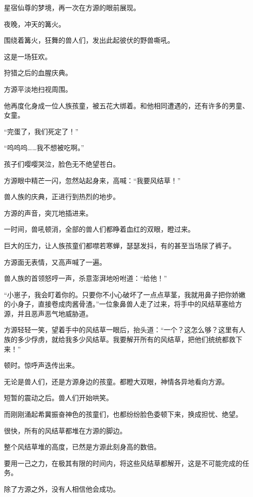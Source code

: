 
\begin{this_body}

星宿仙尊的梦境，再一次在方源的眼前展现。

夜晚，冲天的篝火。

围绕着篝火，狂舞的兽人们，发出此起彼伏的野兽嘶吼。

这是一场狂欢。

狩猎之后的血腥庆典。

方源平淡地扫视周围。

他再度化身成一位人族孩童，被五花大绑着。和他相同遭遇的，还有许多的男童、女童。

“完蛋了，我们死定了！”

“呜呜呜……我不想被吃啊。”

孩子们嘤嘤哭泣，脸色无不绝望苍白。

方源眼中精芒一闪，忽然站起身来，高喊：“我要风结草！”

兽人族的庆典，正进行到热烈的地步。

方源的声音，突兀地插进来。

一时间，兽吼顿消，全部的兽人们都睁着血红的双眼，瞪过来。

巨大的压力，让人族孩童们都噤若寒蝉，瑟瑟发抖，有的甚至当场尿了裤子。

方源面无表情，又高声喊了一遍。

兽人族的首领怒哼一声，杀意澎湃地吩咐道：“给他！”

“小崽子，我会盯着你的。只要你不小心破坏了一点点草茎，我就用鼻子把你娇嫩的小身子，直接卷成肉酱骨渣。”一位象鼻兽人走了过来，将手中的风结草塞给方源，并且恶声恶气地威胁道。

方源轻轻一笑，望着手中的风结草一眼后，抬头道：“一个？这怎么够？这里有人族的多少俘虏，就给我多少风结草。我要解开所有的风结草，把他们统统都救下来！”

顿时。惊呼声迭传出来。

无论是兽人们，还是方源身边的孩童。都瞪大双眼，神情各异地看向方源。

短暂的震动之后。兽人们开始哄笑。

而刚刚涌起希冀振奋神色的孩童们，也都纷纷脸色委顿下来，换成担忧、绝望。

很快，所有的风结草都堆在方源的脚边。

整个风结草堆的高度，已然是方源此刻身高的数倍。

要用一己之力，在极其有限的时间内，将这些风结草都解开，这是不可能完成的任务。

除了方源之外，没有人相信他会成功。


\end{this_body}
